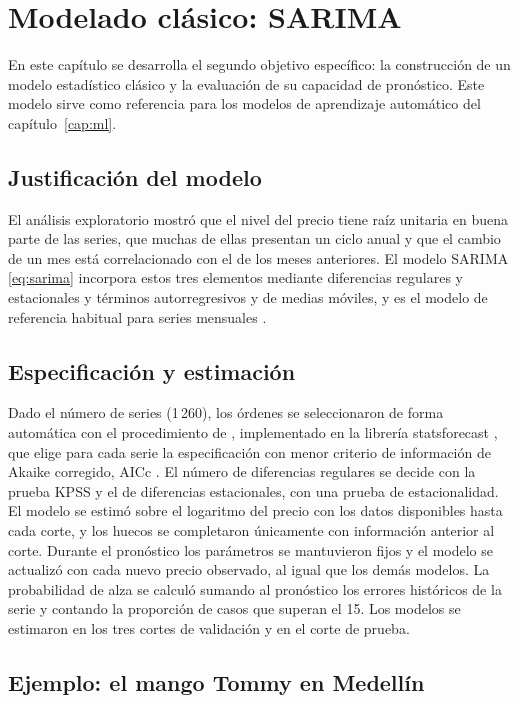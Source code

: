 \chapter{Modelado clásico: SARIMA}
\label{cap:sarima}

En este capítulo se desarrolla el segundo objetivo específico: la construcción de un modelo estadístico clásico y la evaluación de su capacidad de pronóstico. Este modelo sirve como referencia para los modelos de aprendizaje automático del capítulo~\ref{cap:ml}.

\section{Justificación del modelo}

El análisis exploratorio mostró que el nivel del precio tiene raíz unitaria en buena parte de las series, que muchas de ellas presentan un ciclo anual y que el cambio de un mes está correlacionado con el de los meses anteriores. El modelo SARIMA \eqref{eq:sarima} incorpora estos tres elementos mediante diferencias regulares y estacionales y términos autorregresivos y de medias móviles, y es el modelo de referencia habitual para series mensuales \citep{box2015}.

\section{Especificación y estimación}

Dado el número de series (1\,260), los órdenes se seleccionaron de forma automática con el procedimiento de \citet{hyndman2008auto}, implementado en la librería statsforecast \citep{garza2022}, que elige para cada serie la especificación con menor criterio de información de Akaike corregido, AICc \citep{hurvich1989}. El número de diferencias regulares se decide con la prueba KPSS y el de diferencias estacionales, con una prueba de estacionalidad. El modelo se estimó sobre el logaritmo del precio con los datos disponibles hasta cada corte, y los huecos se completaron únicamente con información anterior al corte. Durante el pronóstico los parámetros se mantuvieron fijos y el modelo se actualizó con cada nuevo precio observado, al igual que los demás modelos. La probabilidad de alza se calculó sumando al pronóstico los errores históricos de la serie y contando la proporción de casos que superan el 15\pct. Los modelos se estimaron en los tres cortes de validación y en el corte de prueba.

\section{Ejemplo: el mango Tommy en Medellín}

